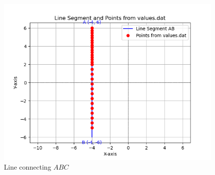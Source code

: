 \documentclass[journal]{IEEEtran}
\begin{document}
\begin{figure}[h!]
   \centering
   \includegraphics[width=0.7\linewidth]{figs/Figure_1.png}
   \caption{Line connecting $ABC$}
   \label{stemplot}
\end{figure}
	
\end{document}

